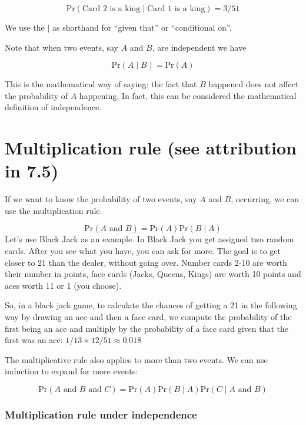 \documentclass[
  openany]{book}
\begin{document}
\[
\mbox{Pr}(\mbox{Card 2 is a king} \mid \mbox{Card 1 is a king}) = 3/51
\]

We use the \(\mid\) as shorthand for ``given that'' or ``conditional on''.

Note that when two events, say \(A\) and \(B\), are independent we have

\[
\mbox{Pr}(A \mid B) = \mbox{Pr}(A)
\]

This is the mathematical way of saying: the fact that \(B\) happened does not affect the probability of \(A\) happening.
In fact, this can be considered the mathematical definition of independence.

\hypertarget{multiplication-rule-see-attribution-in-7.5}{%
\section{Multiplication rule (see attribution in 7.5)}\label{multiplication-rule-see-attribution-in-7.5}}

If we want to know the probability of two events, say \(A\) and \(B\), occurring, we can use the multiplication rule.

\[
\mbox{Pr}(A \mbox{ and } B) = \mbox{Pr}(A)\mbox{Pr}(B \mid A)
\]
Let's use Black Jack as an example. In Black Jack you get assigned two random cards. After you see what you have, you can ask for more. The goal is to get closer to 21 than the dealer, without going over. Number cards 2-10 are worth their number in points, face cards (Jacks, Queens, Kings) are worth 10 points and aces worth 11 or 1 (you choose).

So, in a black jack game, to calculate the chances of getting a 21 in the following way by drawing an ace and then a face card, we compute the probability of the first being an ace and multiply by the probability of a face card given that the first was an ace: \(1/13 \times 12/51 \approx 0.018\)

The multiplicative rule also applies to more than two events. We can use induction to expand for more events:

\[
\mbox{Pr}(A \mbox{ and } B \mbox{ and } C) = \mbox{Pr}(A)\mbox{Pr}(B \mid A)\mbox{Pr}(C \mid A \mbox{ and } B)
\]

\hypertarget{multiplication-rule-under-independence}{%
\subsubsection{Multiplication rule under independence}\label{multiplication-rule-under-independence}}
\end{document}
